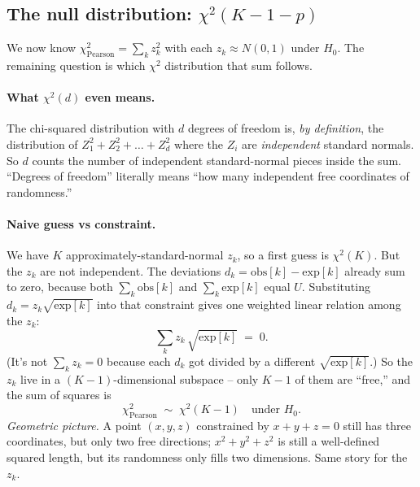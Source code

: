 \documentclass[11pt]{article}
\newcommand{\obs}{\mathrm{obs}}
\newcommand{\expc}{\mathrm{exp}}
\begin{document}
\subsection{The null distribution: $\chi^{2}(K - 1 - p)$}

We now know $\chi^{2}_{\text{Pearson}} = \sum_k z_k^2$ with each
$z_k \approx N(0,1)$ under $H_0$. The remaining question is which $\chi^{2}$
distribution that sum follows.

\paragraph{What $\chi^{2}(d)$ even means.}
The chi-squared distribution with $d$ degrees of freedom is, \emph{by
definition}, the distribution of $Z_1^2 + Z_2^2 + \dots + Z_d^2$ where the
$Z_i$ are \emph{independent} standard normals. So $d$ counts the number of
independent standard-normal pieces inside the sum. ``Degrees of freedom''
literally means ``how many independent free coordinates of randomness.''

\paragraph{Naive guess vs constraint.}
We have $K$ approximately-standard-normal $z_k$, so a first guess is
$\chi^{2}(K)$. But the $z_k$ are not independent. The deviations
$d_k = \obs[k] - \expc[k]$ already sum to zero, because both $\sum_k \obs[k]$
and $\sum_k \expc[k]$ equal $U$. Substituting
$d_k = z_k \sqrt{\expc[k]}$ into that constraint gives one weighted linear
relation among the $z_k$:
\[
   \sum_k z_k\,\sqrt{\expc[k]} \;=\; 0.
\]
(It's not $\sum_k z_k = 0$ because each $d_k$ got divided by a different
$\sqrt{\expc[k]}$.) So the $z_k$ live in a $(K-1)$-dimensional subspace --
only $K - 1$ of them are ``free,'' and the sum of squares is
\[
   \chi^{2}_{\text{Pearson}} \;\sim\; \chi^{2}(K - 1) \quad \text{under } H_0.
\]
\emph{Geometric picture.} A point $(x,y,z)$ constrained by $x + y + z = 0$
still has three coordinates, but only two free directions; $x^2+y^2+z^2$ is
still a well-defined squared length, but its randomness only fills two
dimensions. Same story for the $z_k$.
\end{document}
